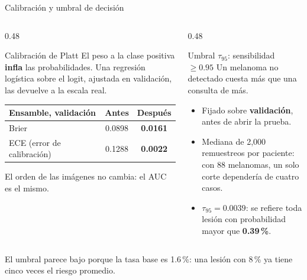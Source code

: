 \documentclass[aspectratio=169,10pt]{beamer}
\begin{document}
\begin{frame}{Calibración y umbral de decisión}
  \begin{columns}[T]
    \begin{column}{0.48\textwidth}
      \begin{block}{Calibración de Platt}
        El peso a la clase positiva \textbf{infla} las probabilidades. Una regresión logística sobre el logit, ajustada en validación, las devuelve a la escala real.
      \end{block}
      \begin{center}
        \small
        \begin{tabular}{lcc}
          \toprule
          \textbf{Ensamble, validación} & \textbf{Antes} & \textbf{Después} \\
          \midrule
          Brier & 0.0898 & \textbf{0.0161} \\
          ECE (error de calibración) & 0.1288 & \textbf{0.0022} \\
          \bottomrule
        \end{tabular}
      \end{center}
      \small El orden de las imágenes no cambia: el AUC es el mismo.
    \end{column}
    \begin{column}{0.48\textwidth}
      \begin{block}{Umbral $\tau_{95}$: sensibilidad $\geq 0.95$}
        Un melanoma no detectado cuesta más que una consulta de más.
        \begin{itemize}
          \item Fijado sobre \textbf{validación}, antes de abrir la prueba.
          \item Mediana de 2,000 remuestreos por paciente: con 88 melanomas, un solo corte dependería de cuatro casos.
          \item $\tau_{95} = 0.0039$: se refiere toda lesión con probabilidad mayor que \textbf{0.39\,\%}.
        \end{itemize}
      \end{block}
    \end{column}
  \end{columns}
  \vspace{0.4em}
  \begin{center}
    \small El umbral parece bajo porque la tasa base es 1.6\,\%: una lesión con 8\,\% ya tiene cinco veces el riesgo promedio.
  \end{center}
\end{frame}
\end{document}
